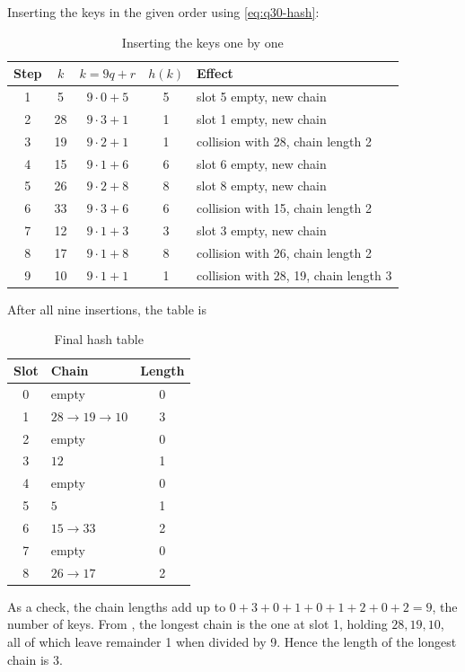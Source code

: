 \begin{enumerate}[label=\thesubsection.\arabic*, ref=\thesubsection.\theenumi]
Inserting the keys in the given order using \eqref{eq:q30-hash}:
\begin{table}[H]
\centering
\begin{tabular}{|c|c|c|c|l|}
\hline
Step & $k$ & $k = 9q + r$ & $h(k)$ & Effect \\
\hline
1 & 5  & $9 \cdot 0 + 5$ & 5 & slot 5 empty, new chain \\
2 & 28 & $9 \cdot 3 + 1$ & 1 & slot 1 empty, new chain \\
3 & 19 & $9 \cdot 2 + 1$ & 1 & collision with 28, chain length 2 \\
4 & 15 & $9 \cdot 1 + 6$ & 6 & slot 6 empty, new chain \\
5 & 26 & $9 \cdot 2 + 8$ & 8 & slot 8 empty, new chain \\
6 & 33 & $9 \cdot 3 + 6$ & 6 & collision with 15, chain length 2 \\
7 & 12 & $9 \cdot 1 + 3$ & 3 & slot 3 empty, new chain \\
8 & 17 & $9 \cdot 1 + 8$ & 8 & collision with 26, chain length 2 \\
9 & 10 & $9 \cdot 1 + 1$ & 1 & collision with 28, 19, chain length 3 \\
\hline
\end{tabular}
\caption{Inserting the keys one by one}
\label{tab:q30-steps}
\end{table}
After all nine insertions, the table is
\begin{table}[H]
\centering
\begin{tabular}{|c|l|c|}
\hline
Slot & Chain & Length \\
\hline
0 & empty & 0 \\
1 & $28 \to 19 \to 10$ & 3 \\
2 & empty & 0 \\
3 & $12$ & 1 \\
4 & empty & 0 \\
5 & $5$ & 1 \\
6 & $15 \to 33$ & 2 \\
7 & empty & 0 \\
8 & $26 \to 17$ & 2 \\
\hline
\end{tabular}
\caption{Final hash table}
\label{tab:q30-table}
\end{table}
As a check, the chain lengths add up to $0 + 3 + 0 + 1 + 0 + 1 + 2 + 0 + 2 = 9$,
the number of keys. From , the longest chain is the one
at slot 1, holding $28, 19, 10$, all of which leave remainder 1 when divided
by 9. Hence the length of the longest chain is $3$.


\end{enumerate}
